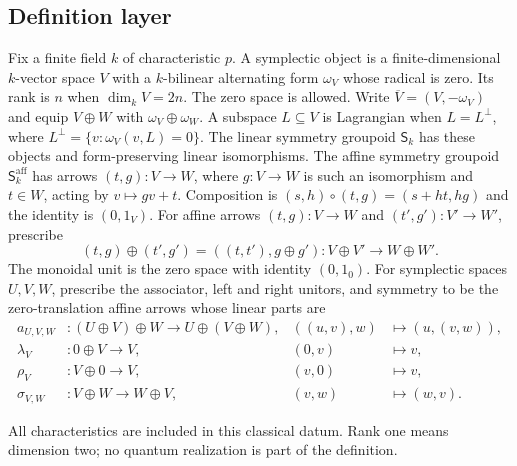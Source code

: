 \subsection{Definition layer}
\begin{definition}
Fix a finite field $k$ of characteristic $p$. A symplectic object is a
finite-dimensional $k$-vector space $V$ with a $k$-bilinear alternating form
$\omega_V$ whose radical is zero. Its rank is $n$ when $\dim_k V=2n$.
The zero space is allowed. Write $\overline V=(V,-\omega_V)$ and equip
$V\oplus W$ with $\omega_V\oplus\omega_W$. A subspace $L\subseteq V$ is
Lagrangian when $L=L^\perp$, where
$L^\perp=\{v:\omega_V(v,L)=0\}$.
The linear symmetry groupoid $\mathsf S_k$ has these objects and
form-preserving linear isomorphisms. The affine symmetry groupoid
$\mathsf S_k^{\mathrm{aff}}$ has arrows $(t,g):V\to W$, where
$g:V\to W$ is such an isomorphism and $t\in W$, acting by $v\mapsto gv+t$.
Composition is $(s,h)\circ(t,g)=(s+ht,hg)$ and the identity is $(0,1_V)$.
For affine arrows $(t,g):V\to W$ and $(t',g'):V'\to W'$, prescribe
\[
 (t,g)\oplus(t',g')=((t,t'),g\oplus g'):
 V\oplus V'\longrightarrow W\oplus W'.
\]
The monoidal unit is the zero space with identity $(0,1_0)$.  For
symplectic spaces $U,V,W$, prescribe the associator, left and right unitors,
and symmetry to be the zero-translation affine arrows whose linear parts are
\[
\begin{aligned}
 a_{U,V,W}&:(U\oplus V)\oplus W\longrightarrow U\oplus(V\oplus W),
 &((u,v),w)&\longmapsto(u,(v,w)),\\
 \lambda_V&:0\oplus V\longrightarrow V,&(0,v)&\longmapsto v,\\
 \rho_V&:V\oplus0\longrightarrow V,&(v,0)&\longmapsto v,\\
 \sigma_{V,W}&:V\oplus W\longrightarrow W\oplus V,&(v,w)&\longmapsto(w,v).
\end{aligned}
\]
\end{definition}
\begin{scope}
All characteristics are included in this classical datum. Rank one means dimension two; no quantum realization is part of the definition.
\end{scope}


